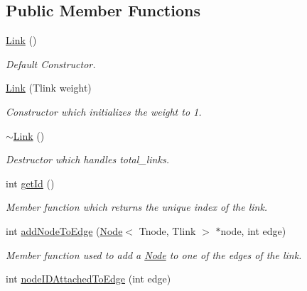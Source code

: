 \subsection*{Public Member Functions}
\begin{DoxyCompactItemize}
\item 
\hyperlink{classLink_aca77f38ecd59de8d21990ac5bbf91a8e}{Link} ()
\begin{DoxyCompactList}\small\item\em Default Constructor. \end{DoxyCompactList}\item 
\hypertarget{classLink_ac99228207446f193a5e4736c6aeb6954}{\hyperlink{classLink_ac99228207446f193a5e4736c6aeb6954}{Link} (Tlink weight)}\label{classLink_ac99228207446f193a5e4736c6aeb6954}

\begin{DoxyCompactList}\small\item\em Constructor which initializes the weight to 1. \end{DoxyCompactList}\item 
\hyperlink{classLink_ad5cb3f4d9cf63f3dd0a150300cce10ad}{$\sim$\-Link} ()
\begin{DoxyCompactList}\small\item\em Destructor which handles total\-\_\-links. \end{DoxyCompactList}\item 
int \hyperlink{classLink_ae082bdae9da5f4c58d91c52af2ea4514}{get\-Id} ()
\begin{DoxyCompactList}\small\item\em Member function which returns the unique index of the link. \end{DoxyCompactList}\item 
\hypertarget{classLink_aab3ab85eaf576b6eec5634ef542f736f}{int \hyperlink{classLink_aab3ab85eaf576b6eec5634ef542f736f}{add\-Node\-To\-Edge} (\hyperlink{classNode}{Node}$<$ Tnode, Tlink $>$ $\ast$node, int edge)}\label{classLink_aab3ab85eaf576b6eec5634ef542f736f}

\begin{DoxyCompactList}\small\item\em Member function used to add a \hyperlink{classNode}{Node} to one of the edges of the link. \end{DoxyCompactList}\item 
\hypertarget{classLink_ac932e7b1a57c0c9599be513a2106970b}{int \hyperlink{classLink_ac932e7b1a57c0c9599be513a2106970b}{node\-I\-D\-Attached\-To\-Edge} (int edge)}\label{classLink_ac932e7b1a57c0c9599be513a2106970b}


\end{DoxyCompactItemize}
